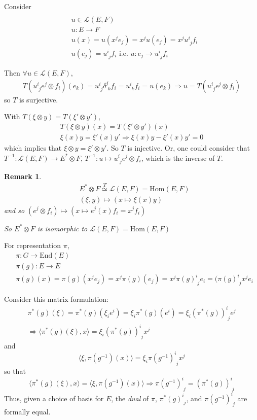 \documentclass[10pt]{amsart}
\newtheorem{remark}{Remark}
\begin{document}
\begin{multicols*}{2}
\begin{enumerate}
	Consider 
	\[
	\begin{aligned} & \quad \\
	& u \in \mathcal{L}(E,F) \\
	& u: E \to F \\
	& u(x) = u(x^je_j) = x^ju(e_j) = x^j u^i_{\,\,j} f_i \\
	& u(e_j) = u^i_{\,\,j}f_i \text{ i.e. } u: e_j \to u^i_{\,\,j}f_i \end{aligned}
	\]
	
	Then $\forall u \in \mathcal{L}(E,F)$,
	\[
	\begin{gathered}
	T(u^i_{\,\, j} e^j \otimes f_i)(e_k) = u^i_{\,\,j}\delta^j_{\,\,k}f_i = u^i_{\,\,k}f_i = u(e_k) \Longrightarrow u = T(u^i_{\,\,j}e^j\otimes f_i)
	\end{gathered}
	\]
	so $T$ is surjective.  
	
	With $T(\xi\otimes y) = T(\xi'\otimes y')$, 
	\[
	\begin{gathered}
	T(\xi\otimes y)(x) = T(\xi' \otimes y')(x) \\
	\xi(x)y = \xi'(x)y' \Longrightarrow \xi(x)y - \xi'(x)y' = 0 
	\end{gathered}
	\]
	which implies that $\xi\otimes y = \xi'\otimes y'$.  So $T$ is injective.  Or, one could consider that $T^{-1} : \mathcal{L}(E,F) \to E^*\otimes F$, $T^{-1} : u \mapsto u^i_{\,\,j}e^j\otimes f_i$, which is the inverse of $T$.  
	
	\begin{remark}
		\[
		\begin{aligned}
		& E^* \otimes F \overset{T}{\simeq} \mathcal{L}(E,F) = \text{Hom}(E,F) \\ 
		& (\xi, y) \mapsto (x \mapsto \xi(x)y) 
		\end{aligned}
		\]
		and so $(e^j \otimes f_i) \mapsto (x\mapsto e^j(x)f_i = x^jf_i)$
		
		So $E^*\otimes F$ is isomorphic to $\mathcal{L}(E,F) = \text{Hom}(E,F)$
	\end{remark}
	
	For representation $\pi$, 
	\[
	\begin{aligned}
	& \pi:G \to \text{End}(E) \\ 
	& \pi(g):E \to E \\ 
	&  \pi(g)(x) = \pi(g)(x^j e_j) = x^j \pi(g)(e_j) = x^j \pi(g)^i_{ \,\, j} e_i = (\pi(g)^i_{\,\,j} x^j e_i
	\end{aligned}
	\]
	
	Consider this matrix formulation:
	\[
	\begin{gathered}
	\pi^*(g)(\xi) = \pi^*(g)(\xi_i e^i) = \xi_i \pi^*(g)(e^i) = \xi_i (\pi^*(g))^i_{\,\,j}e^j \\
	\Longrightarrow \langle \pi^*(g)(\xi), x \rangle = \xi_i (\pi^*(g))^i_{ \,\, j}x^j
	\end{gathered}
	\]
	and 
	\[
	\langle \xi, \pi(g^{-1})(x) \rangle = \xi_i \pi(g^{-1})^i_{ \,\, j}x^j 
	\]
	so that 
	\[
	\langle \pi^*(g)(\xi),x \rangle = \langle \xi, \pi(g^{-1})(x) \rangle \Longrightarrow \pi(g^{-1})^i_{\,\, j} = (\pi^*(g))^i_{ \,\, j}
	\]
	Thus, given a choice of basis for $E$, the \emph{dual} of $\pi$, $\pi^*(g)^i_{\,\,j}$, and $\pi(g^{-1})^i_{\,\,j}$ are formally equal.  
	

\end{enumerate}
\end{multicols*}
\end{document}

